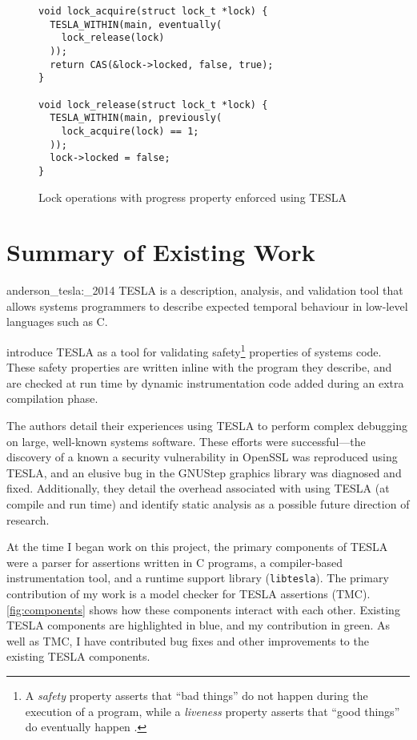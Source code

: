 \begin{figure}
  \begin{verbatim}
void lock_acquire(struct lock_t *lock) {
  TESLA_WITHIN(main, eventually(
    lock_release(lock)
  ));
  return CAS(&lock->locked, false, true);
}

void lock_release(struct lock_t *lock) {
  TESLA_WITHIN(main, previously(
    lock_acquire(lock) == 1;
  ));
  lock->locked = false;
}
  \end{verbatim}
  \caption{Lock operations with progress property enforced using TESLA}
  \label{lst:mutex-better}
\end{figure}

\section{Summary of Existing Work}

\begin{displaycquote}[p. 1]{anderson_tesla:_2014}
TESLA is a description, analysis, and validation tool that allows systems
  programmers to describe expected temporal behaviour in low-level languages
  such as C.
\end{displaycquote}

\textcite{anderson_tesla:_2014} introduce TESLA as a tool for validating
safety\footnote{A \emph{safety} property asserts that ``bad things'' do not
happen during the execution of a program, while a \emph{liveness} property
asserts that ``good things'' do eventually happen
\cite{lamport_proving_1977,alpern_defining_1984}.} properties of systems code.
These safety properties are written inline with the program they describe, and
are checked at run time by dynamic instrumentation code added during an extra
compilation phase.

The authors detail their experiences using TESLA to perform complex debugging on
large, well-known systems software. These efforts were successful---the
discovery of a known a security vulnerability in OpenSSL was reproduced using
TESLA, and an elusive bug in the GNUStep graphics library was diagnosed and
fixed. Additionally, they detail the overhead associated with using TESLA (at
compile and run time) and identify static analysis as a possible future
direction of research.

At the time I began work on this project, the primary components of TESLA were a
parser for assertions written in C programs, a compiler-based instrumentation
tool, and a runtime support library (\texttt{libtesla}). The primary
contribution of my work is a model checker for TESLA assertions (TMC).
\autoref{fig:components} shows how these components interact with each other.
Existing TESLA components are highlighted in blue, and my contribution in green.
As well as TMC, I have contributed bug fixes and other improvements to the
existing TESLA components. 

